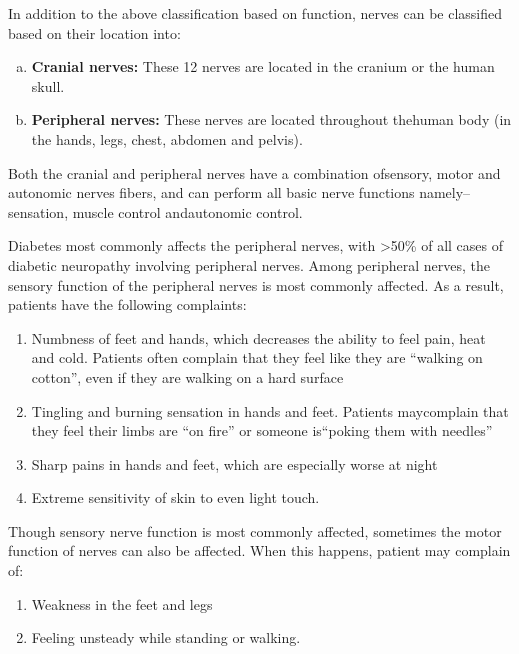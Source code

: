 \noindent In addition to the above classification based on function, nerves can be classified based on their location into:

\vspace{-\topsep}
\begin{enumerate}[a)]
\itemsep=0pt
\item \textbf{Cranial nerves:} These 12 nerves are located in the cranium or the human skull.
\item \textbf{Peripheral nerves:} These nerves are located throughout the\break human body (in the hands, legs, chest, abdomen and pelvis).
\end{enumerate}
\vspace{-\topsep}

Both the cranial and peripheral nerves have a combination of\break sensory, motor and autonomic nerves fibers, and can perform all basic nerve functions namely– sensation, muscle control and\break autonomic control.

Diabetes most commonly affects the peripheral nerves, with \textgreater  50\% of all cases of diabetic neuropathy involving peripheral nerves. Among peripheral nerves, the sensory function of the peripheral nerves is most commonly affected. As a result, patients have the following complaints:

\vspace{-\topsep}
\begin{enumerate}[•]
\itemsep=0pt
\item Numbness of feet and hands, which decreases the ability to feel pain, heat and cold. Patients often complain that they feel like they are “walking on cotton”, even if they are walking on a hard surface
\item Tingling and burning sensation in hands and feet. Patients may\break complain that they feel their limbs are “on fire” or someone is\break “poking them with needles”
\item Sharp pains in hands and feet, which are especially worse at night
\item Extreme sensitivity of skin to even light touch.
\end{enumerate}
\vspace{-\topsep}

\noindent Though sensory nerve function is most commonly affected, sometimes the motor function of nerves can also be affected. When this happens, patient may complain of:

\vspace{-\topsep}
\begin{enumerate}[•]
\itemsep=0pt
\item Weakness in the feet and legs
\item Feeling unsteady while standing or walking.
\end{enumerate}
\vspace{-\topsep}

